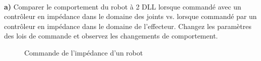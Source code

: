 
\\
\textbf{a)} Comparer le comportement du robot à 2 DLL lorsque commandé avec un contrôleur en impédance dans le domaine des joints vs. lorsque commandé par un contrôleur en impédance dans le domaine de l'effecteur. Changez les paramètres des lois de commande et observez les changements de comportement.
\\
\begin{figure}[H]
        \centering
				\hspace{5pt}
        \caption{Commande de l'impédance d'un robot}
			\label{fig:stiffnesscontrol}
\end{figure}


